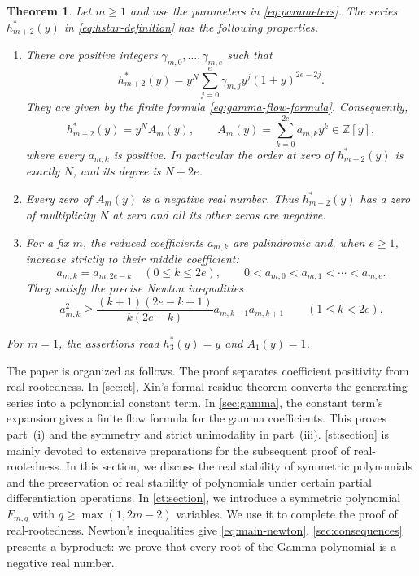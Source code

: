 \documentclass[reqno, 12pt]{article}
\numberwithin{equation}{section}
\newtheorem{theorem}{Theorem}[section]
\theoremstyle{definition}
\newcommand{\ZZ}{\mathbb Z}
\begin{document}
\begin{theorem}\label{thm:resolution}
Let $m\geq1$ and use the parameters in \eqref{eq:parameters}.
The series $h_{m+2}^*(y)$ in \eqref{eq:hstar-definition} has the
following properties.
\begin{enumerate}
\item[(i)] There are positive integers $\gamma_{m,0},\ldots,\gamma_{m,e}$ such that
\begin{equation}\label{eq:gamma-main}
h_{m+2}^*(y)=y^N\sum_{j=0}^e
\gamma_{m,j}y^j(1+y)^{2e-2j}.
\end{equation}
They are given by the finite formula \eqref{eq:gamma-flow-formula}.  Consequently,
\begin{equation}\label{eq:reduced-definition}
h_{m+2}^*(y)=y^NA_m(y),\qquad
A_m(y)=\sum_{k=0}^{2e}a_{m,k}y^k\in\ZZ[y],
\end{equation}
where every $a_{m,k}$ is positive.  In particular the order at zero of $h_{m+2}^*(y)$ is exactly $N$, and its degree is $N+2e$.

\item[(ii)] Every zero of $A_m(y)$ is a negative real number. Thus $h_{m+2}^*(y)$ has a zero of multiplicity $N$ at zero and all
its other zeros are negative.

\item[(iii)] For a fix $m$, the reduced coefficients $a_{m,k}$ are palindromic and, when $e\geq1$, increase strictly to their middle coefficient:
\[a_{m,k}=a_{m,2e-k}\quad(0\leq k\leq2e),\qquad 0<a_{m,0}<a_{m,1}<\cdots<a_{m,e}.\]
They satisfy the precise Newton inequalities
\begin{equation}\label{eq:main-newton}
a_{m,k}^2\geq \frac{(k+1)(2e-k+1)}{k(2e-k)}a_{m,k-1}a_{m,k+1} \qquad(1\leq k<2e).
\end{equation}
\end{enumerate}
For $m=1$, the assertions read $h_3^*(y)=y$ and $A_1(y)=1$.
\end{theorem}

The paper is organized as follows. The proof separates coefficient positivity from real-rootedness.
In \cref{sec:ct}, Xin's formal residue theorem \cite[Theorem~3-2.7]{XinThesis} converts the generating series
into a polynomial constant term.  
In \cref{sec:gamma}, the constant term's expansion gives a finite flow formula for the gamma coefficients. 
This proves part~\textup{(i)} and the symmetry and strict unimodality in part~\textup{(iii)}.
\cref{st:section} is mainly devoted to extensive preparations for the subsequent proof of real-rootedness.
In this section, we discuss the real stability of symmetric polynomials and the preservation of real stability of polynomials under certain partial differentiation operations.
In \cref{ct:section}, we introduce a symmetric polynomial $F_{m,q}$ with $q\geq\max(1,2m-2)$ variables. We use it to complete the proof of real-rootedness. Newton's inequalities give \eqref{eq:main-newton}.
\cref{sec:consequences} presents a byproduct: we prove that every root of the Gamma polynomial is a negative real number.
\end{document}
